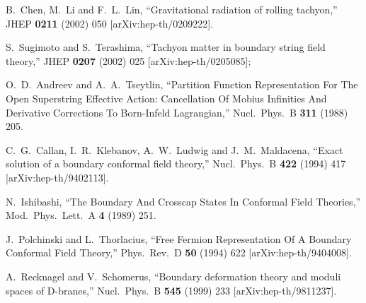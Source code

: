 \documentclass[a4paper,12pt]{article}
\begin{document}
\begin{thebibliography}{99}
B.~Chen, M.~Li and F.~L.~Lin,
``Gravitational radiation of rolling tachyon,''
JHEP {\bf 0211} (2002) 050
[arXiv:hep-th/0209222].



S.~Sugimoto and S.~Terashima,
``Tachyon matter in boundary string field theory,''
JHEP {\bf 0207} (2002) 025
[arXiv:hep-th/0205085];

O.~D.~Andreev and A.~A.~Tseytlin,
``Partition Function Representation For The Open Superstring Effective Action: Cancellation Of Mobius Infinities And Derivative Corrections To
Born-Infeld Lagrangian,''
Nucl.\ Phys.\ B {\bf 311} (1988) 205.


C.~G.~Callan, I.~R.~Klebanov, A.~W.~Ludwig and J.~M.~Maldacena,
``Exact solution of a boundary conformal field theory,''
Nucl.\ Phys.\ B {\bf 422} (1994) 417
[arXiv:hep-th/9402113].

N.~Ishibashi,
``The Boundary And Crosscap States In Conformal Field Theories,''
Mod.\ Phys.\ Lett.\ A {\bf 4} (1989) 251.

J.~Polchinski and L.~Thorlacius,
``Free Fermion Representation Of A Boundary Conformal Field Theory,''
Phys.\ Rev.\ D {\bf 50} (1994) 622
[arXiv:hep-th/9404008].

A.~Recknagel and V.~Schomerus,
``Boundary deformation theory and moduli spaces of D-branes,''
Nucl.\ Phys.\ B {\bf 545} (1999) 233
[arXiv:hep-th/9811237].




\end{thebibliography}
 
\end{document}
